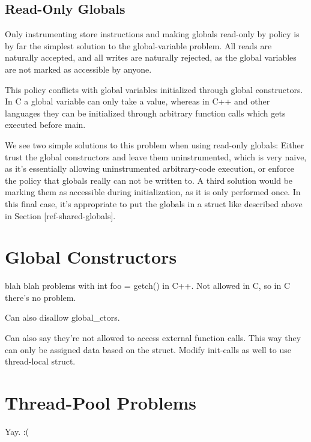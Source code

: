 \subsection {Read-Only Globals}

Only instrumenting store instructions and making globals read-only by policy is
by far the simplest solution to the global-variable problem. All reads are
naturally accepted, and all writes are naturally rejected, as the global
variables are not marked as accessible by anyone.

This policy conflicts with global variables initialized through global
constructors. In C a global variable can only take a value, whereas in C++ and
other languages they can be initialized through arbitrary function calls which
gets executed before main.

We see two simple solutions to this problem when using read-only globals: Either
trust the global constructors and leave them uninstrumented, which is very
naive, as it's essentially allowing uninstrumented arbitrary-code execution, or
enforce the policy that globals really can not be written to. A third solution
would be marking them as accessible during initialization, as it is only
performed once. In this final case, it's appropriate to put the globals in a
struct like described above in Section [ref-shared-globals].


\section {Global Constructors}

blah blah problems with int foo = getch() in C++. Not allowed in C, so in C
there's no problem.

Can also disallow global\_ctors.

Can also say they're not allowed to access external function calls. This way
they can only be assigned data based on the struct. Modify init-calls as well
to use thread-local struct.


\section {Thread-Pool Problems}

Yay. :(

